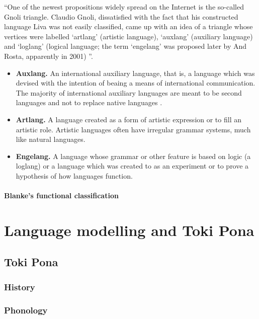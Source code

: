 \documentclass[14pt, a4paper]{extreport}
\begin{document}
``One of the newest propositions widely spread on the Internet is the so-called Gnoli triangle. Claudio Gnoli, dissatisfied with the fact that his constructed language Liva was not easily classified, came up with an idea of a triangle whose vertices were labelled ‘artlang’ (artistic language), ‘auxlang’ (auxiliary language) and ‘loglang’ (logical language; the term ‘engelang’ was proposed later by And Rosta, apparently in 2001) \parencite[97]{stria}''.

\begin{itemize}
  \item \textbf{Auxlang.} An international auxiliary language, that is, a language which was devised with the intention of beaing a means of international communication. The majority of international auxiliary languages are meant to be second languages and not to replace native languages \parencite{reed}.
  \item \textbf{Artlang.} A language created as a form of artistic expression or to fill an artistic role. Artistic languages often have irregular grammar systems, much like natural languages.
  \item \textbf{Engelang.} A language whose grammar or other feature is based on logic (a loglang) or a language which was created to as an experiment or to prove a hypothesis of how languages function.
\end{itemize}

\subsubsection{Blanke's functional classification}





\chapter{Language modelling and Toki Pona}

\section{Toki Pona}

\subsection{History}

\subsection{Phonology}
\end{document}
